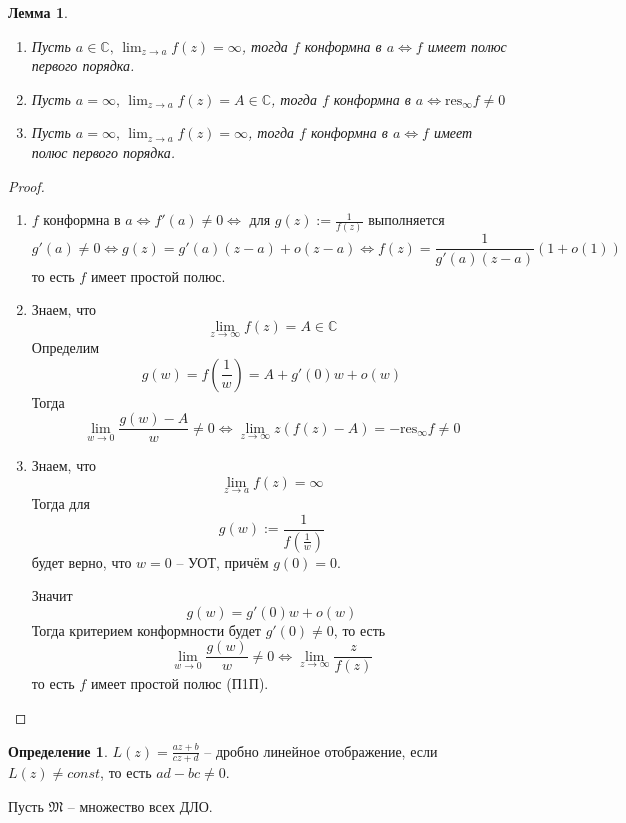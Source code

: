 \documentclass[a4paper,12pt]{article}
\theoremstyle{plain}
\newtheorem{lemma}{Лемма}[section]
\theoremstyle{definition}
\newtheorem{definition}{Определение}[section]
\theoremstyle{remark}
\begin{document}
\begin{lemma}
	\begin{enumerate}
		\item Пусть $a \in \mathbb{C},\, \lim_{z \to a}f(z) = \infty$, тогда $f$ конформна в $a \Leftrightarrow f$ имеет полюс первого порядка.
		\item Пусть $a = \infty,\, \lim_{z \to a}f(z) = A \in \mathbb{C}$, тогда $f$ конформна в $a \Leftrightarrow \text{res}_\infty f \neq 0$
		\item Пусть $a = \infty,\, \lim_{z \to a}f(z) = \infty$, тогда $f$ конформна в $a \Leftrightarrow f$ имеет полюс первого порядка.
	\end{enumerate}
\end{lemma}

\begin{proof}
	\begin{enumerate}
		\item $f$ конформна в $a \Leftrightarrow f'(a) \neq 0 \Leftrightarrow $ для $g(z) := \frac{1}{f(z)}$ выполняется
		      \[
			      g'(a) \neq 0 \Leftrightarrow g(z) = g'(a)(z - a) + o(z - a) \Leftrightarrow f(z) = \frac{1}{g'(a)(z - a)}(1 + o(1))
		      \]
		      то есть $f$ имеет простой полюс.
		\item Знаем, что
		      \[
			      \lim_{z \to \infty} f(z) = A \in \mathbb{C}
		      \]
		      Определим
		      \[
			      g(w) = f\left(\frac{1}{w}\right) = A + g'(0)w + o(w)
		      \]
		      Тогда
		      \[
			      \lim_{w \to 0}\frac{g(w) - A}{w} \neq 0 \Leftrightarrow \lim_{z \to \infty}z(f(z) - A) = -\text{res}_\infty f \neq 0
		      \]
		\item Знаем, что
		      \[
			      \lim_{z \to a} f(z) = \infty
		      \]
		      Тогда для
		      \[
			      g(w) := \frac{1}{f(\frac{1}{w})}
		      \]
		      будет верно, что $w = 0$ -- УОТ, причём $g(0) = 0$.

		      Значит
		      \[
			      g(w) = g'(0)w + o(w)
		      \]
		      Тогда критерием конформности будет $g'(0) \neq 0$, то есть
		      \[
			      \lim_{w \to 0}\frac{g(w)}{w} \neq 0 \Leftrightarrow \lim_{z \to \infty}\frac{z}{f(z)}
		      \]
		      то есть $f$ имеет простой полюс (П1П).
	\end{enumerate}
\end{proof}

\begin{definition}
	$L(z) = \frac{az + b}{cz + d}$ -- дробно линейное отображение, если $L(z) \neq const$, то есть $ad - bc \neq 0$.

	Пусть $\mathfrak{M}$ -- множество всех ДЛО.
\end{definition}
\end{document}
